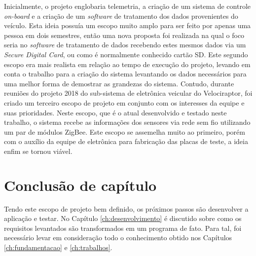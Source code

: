 Inicialmente, o projeto englobaria telemetria, a criação de um sistema de controle \textit{on-board} e a criação de um \textit{software} de tratamento dos dados provenientes do veículo. Esta ideia possuía um escopo muito amplo para ser feito por apenas uma pessoa em dois semestres, então uma nova proposta foi realizada na qual o foco seria no \textit{software} de tratamento de dados recebendo estes mesmos dados via um \textit{Secure Digital Card}, ou como é normalmente conhecido cartão SD. Este segundo escopo era mais realista em relação ao tempo de execução do projeto, levando em conta o trabalho para a criação do sistema levantando os dados necessários para uma melhor forma de demostrar as grandezas do sistema. Contudo, durante reuniões do projeto 2018 do sub-sistema de eletrônica veicular do Velociraptor, foi criado um terceiro escopo de projeto em conjunto com os interesses da equipe e suas prioridades. Neste escopo, que é o atual desenvolvido e testado neste trabalho, o sistema recebe as informações dos sensores via rede sem fio utilizando um par de módulos ZigBee. Este escopo se assemelha muito ao primeiro, porém com o auxílio da equipe de eletrônica para fabricação das placas de teste, a ideia enfim se tornou viável.

\section{Conclusão de capítulo}
Tendo este escopo de projeto bem definido, os próximos passos são desenvolver a aplicação e testar. No Capítulo \ref{ch:desenvolvimento} é discutido sobre como os requisitos levantados são transformados em um programa de fato. Para tal, foi necessário levar em consideração todo o conhecimento obtido nos Capítulos \ref{ch:fundamentacao} e \ref{ch:trabalhos}.  